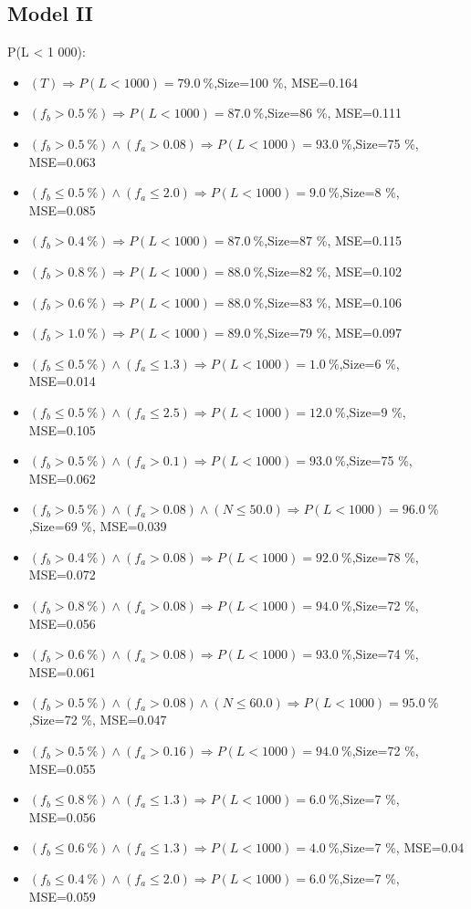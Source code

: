 \documentclass[numbered]{CSL}
\begin{document}
\subsection{Model II}
P(L < 1 000):
\begin{itemize}
\item $(T) \Rightarrow P(L < 1 000) = 79.0~\%$,\hfill Size=100 \%, MSE=0.164
\item $(f_b > 0.5~\%) \Rightarrow P(L < 1 000) = 87.0~\%$,\hfill Size=86 \%, MSE=0.111
\item $(f_b > 0.5~\%) \land (f_a > 0.08) \Rightarrow P(L < 1 000) = 93.0~\%$,\hfill Size=75 \%, MSE=0.063
\item $(f_b \leq 0.5~\%) \land (f_a \leq 2.0) \Rightarrow P(L < 1 000) = 9.0~\%$,\hfill Size=8 \%, MSE=0.085
\item $(f_b > 0.4~\%) \Rightarrow P(L < 1 000) = 87.0~\%$,\hfill Size=87 \%, MSE=0.115
\item $(f_b > 0.8~\%) \Rightarrow P(L < 1 000) = 88.0~\%$,\hfill Size=82 \%, MSE=0.102
\item $(f_b > 0.6~\%) \Rightarrow P(L < 1 000) = 88.0~\%$,\hfill Size=83 \%, MSE=0.106
\item $(f_b > 1.0~\%) \Rightarrow P(L < 1 000) = 89.0~\%$,\hfill Size=79 \%, MSE=0.097
\item $(f_b \leq 0.5~\%) \land (f_a \leq 1.3) \Rightarrow P(L < 1 000) = 1.0~\%$,\hfill Size=6 \%, MSE=0.014
\item $(f_b \leq 0.5~\%) \land (f_a \leq 2.5) \Rightarrow P(L < 1 000) = 12.0~\%$,\hfill Size=9 \%, MSE=0.105
\item $(f_b > 0.5~\%) \land (f_a > 0.1) \Rightarrow P(L < 1 000) = 93.0~\%$,\hfill Size=75 \%, MSE=0.062
\item $(f_b > 0.5~\%) \land (f_a > 0.08) \land (N \leq 50.0) \Rightarrow P(L < 1 000) = 96.0~\%$,\hfill Size=69 \%, MSE=0.039
\item $(f_b > 0.4~\%) \land (f_a > 0.08) \Rightarrow P(L < 1 000) = 92.0~\%$,\hfill Size=78 \%, MSE=0.072
\item $(f_b > 0.8~\%) \land (f_a > 0.08) \Rightarrow P(L < 1 000) = 94.0~\%$,\hfill Size=72 \%, MSE=0.056
\item $(f_b > 0.6~\%) \land (f_a > 0.08) \Rightarrow P(L < 1 000) = 93.0~\%$,\hfill Size=74 \%, MSE=0.061
\item $(f_b > 0.5~\%) \land (f_a > 0.08) \land (N \leq 60.0) \Rightarrow P(L < 1 000) = 95.0~\%$,\hfill Size=72 \%, MSE=0.047
\item $(f_b > 0.5~\%) \land (f_a > 0.16) \Rightarrow P(L < 1 000) = 94.0~\%$,\hfill Size=72 \%, MSE=0.055
\item $(f_b \leq 0.8~\%) \land (f_a \leq 1.3) \Rightarrow P(L < 1 000) = 6.0~\%$,\hfill Size=7 \%, MSE=0.056
\item $(f_b \leq 0.6~\%) \land (f_a \leq 1.3) \Rightarrow P(L < 1 000) = 4.0~\%$,\hfill Size=7 \%, MSE=0.04
\item $(f_b \leq 0.4~\%) \land (f_a \leq 2.0) \Rightarrow P(L < 1 000) = 6.0~\%$,\hfill Size=7 \%, MSE=0.059
\end{itemize}
\end{document}
